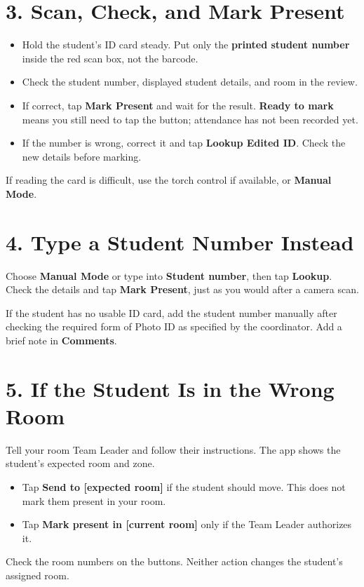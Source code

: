 \documentclass[10pt,a4paper]{article}
\begin{document}
\section*{3. Scan, Check, and Mark Present}
\begin{itemize}\item[1.] Hold the student's ID card steady. Put only the \textbf{printed student number} inside the red scan box, not the barcode.\end{itemize}
\begin{itemize}\item[2.] Check the student number, displayed student details, and room in the review.\end{itemize}
\begin{itemize}\item[3.] If correct, tap \textbf{Mark Present} and wait for the result. \textbf{Ready to mark} means you still need to tap the button; attendance has not been recorded yet.\end{itemize}
\begin{itemize}\item[4.] If the number is wrong, correct it and tap \textbf{Lookup Edited ID}. Check the new details before marking.\end{itemize}
If reading the card is difficult, use the torch control if available, or \textbf{Manual Mode}.\par
\section*{4. Type a Student Number Instead}
Choose \textbf{Manual Mode} or type into \textbf{Student number}, then tap \textbf{Lookup}. Check the details and tap \textbf{Mark Present}, just as you would after a camera scan.\par
If the student has no usable ID card, add the student number manually after checking the required form of Photo ID as specified by the coordinator. Add a brief note in \textbf{Comments}.\par
\newpage
\section*{5. If the Student Is in the Wrong Room}
Tell your room Team Leader and follow their instructions. The app shows the student's expected room and zone.\par
\begin{itemize}\item[\textbullet] Tap \textbf{Send to [expected room]} if the student should move. This does not mark them present in your room.\end{itemize}
\begin{itemize}\item[\textbullet] Tap \textbf{Mark present in [current room]} only if the Team Leader authorizes it.\end{itemize}
Check the room numbers on the buttons. Neither action changes the student's assigned room.\par
\end{document}
